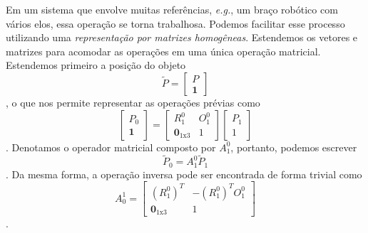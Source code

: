 Em um sistema que envolve muitas referências, \emph{e.g.}, um braço robótico com vários elos, essa operação se torna trabalhosa. Podemos facilitar esse processo utilizando uma \emph{representação por matrizes homogêneas}. Estendemos os vetores e matrizes para acomodar as operações em uma única operação matricial. Estendemos primeiro a posição do objeto \[
    \widetilde{P} = \begin{bmatrix} P \\ \bm{1} \end{bmatrix} 
\], o que nos permite representar as operações prévias como \[
\begin{bmatrix} P_0 \\ \bm{1} \end{bmatrix} = \begin{bmatrix} R_1^{0} & O_1^{0} \\ \bm{0}_{1\text{x}3} & 1 \end{bmatrix} \begin{bmatrix} P_1 \\ 1 \end{bmatrix} 
\]. Denotamos o operador matricial composto por $A_1^{0}$, portanto, podemos escrever \[
\widetilde{P}_0 = A_1^{0}\widetilde{P}_1
\]. Da mesma forma, a operação inversa pode ser encontrada de forma trivial como \[
A_0^{1} = \begin{bmatrix} \left( R_1^{0} \right) ^{T} & -\left( R_1^{0} \right) ^{T}O_1^{0} \\ \bm{0}_{1\text{x}3} & 1 \end{bmatrix} 
\].

